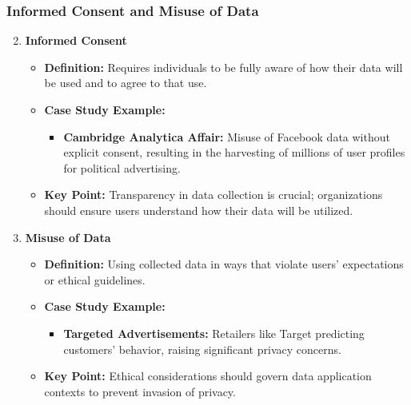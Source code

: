 \documentclass[aspectratio=169]{beamer}
\begin{document}
\begin{frame}[fragile]
    \frametitle{Informed Consent and Misuse of Data}
    \begin{enumerate}
        \setcounter{enumi}{1}
        \item \textbf{Informed Consent}
        \begin{itemize}
            \item \textbf{Definition:} Requires individuals to be fully aware of how their data will be used and to agree to that use.
            \item \textbf{Case Study Example:} 
            \begin{itemize}
                \item \textbf{Cambridge Analytica Affair:} Misuse of Facebook data without explicit consent, resulting in the harvesting of millions of user profiles for political advertising.
            \end{itemize}
            \item \textbf{Key Point:} Transparency in data collection is crucial; organizations should ensure users understand how their data will be utilized.
        \end{itemize}

        \item \textbf{Misuse of Data}
        \begin{itemize}
            \item \textbf{Definition:} Using collected data in ways that violate users' expectations or ethical guidelines.
            \item \textbf{Case Study Example:} 
            \begin{itemize}
                \item \textbf{Targeted Advertisements:} Retailers like Target predicting customers' behavior, raising significant privacy concerns.
            \end{itemize}
            \item \textbf{Key Point:} Ethical considerations should govern data application contexts to prevent invasion of privacy.
        \end{itemize}
    \end{enumerate}
\end{frame}
\end{document}
